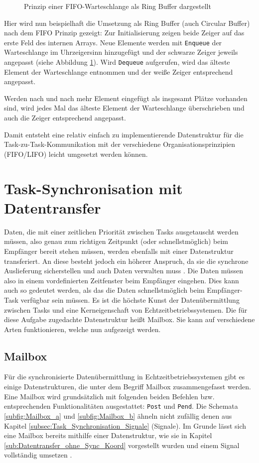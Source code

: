\documentclass{llncs}
\begin{document}
\begin{figure}
	\centering
	\def\svgwidth{0.30\columnwidth}
	
	\caption{\label{fig:RingBuffer}Prinzip einer FIFO-Warteschlange als Ring Buffer dargestellt \autocite[vgl.][97]{Cooling2017}}
\end{figure}

Hier wird nun beispielhaft die Umsetzung als Ring Buffer (auch Circular Buffer) nach dem FIFO Prinzip gezeigt: Zur Initialisierung zeigen beide Zeiger auf das erste Feld des internen Arrays. Neue Elemente werden mit \texttt{Enqueue} der Warteschlange im Uhrzeigersinn hinzugefügt und der schwarze Zeiger jeweils angepasst (siehe Abbildung \ref{fig:RingBuffer}). Wird \texttt{Dequeue} aufgerufen, wird das älteste Element der Warteschlange entnommen und der weiße Zeiger entsprechend angepasst.

Werden nach und nach mehr Element eingefügt als insgesamt Plätze vorhanden sind, wird jedes Mal das älteste Element der Warteschlange überschrieben und auch die Zeiger entsprechend angepasst.

Damit entsteht eine relativ einfach zu implementierende Datenstruktur für die Task-zu-Task-Kommunikation mit der verschiedene Organisationsprinzipien (FIFO/LIFO) leicht umgesetzt werden können.

\section{Task-Synchronisation mit Datentransfer}
\label{sub:Task_Synchronisation_Datentransfer}
Daten, die mit einer zeitlichen Priorität zwischen Tasks ausgetauscht werden müssen, also genau zum richtigen Zeitpunkt (oder schnellstmöglich) beim Empfänger bereit stehen müssen, werden ebenfalls mit einer Datenstruktur transferiert. An diese besteht jedoch ein höherer Anspruch, da sie die synchrone Auslieferung sicherstellen und auch Daten verwalten muss \autocite[vgl.][99]{Cooling2017}. Die Daten müssen also in einem vordefinierten Zeitfenster beim Empfänger eingehen. Dies kann auch so gedeutet werden, als das die Daten schnellstmöglich beim Empfänger-Task verfügbar sein müssen. Es ist die höchste Kunst der Datenübermittlung zwischen Tasks und eine Kerneigenschaft von Echtzeitbetriebssystemen. Die für diese Aufgabe zugedachte Datenstruktur heißt Mailbox. Sie kann auf verschiedene Arten funktionieren, welche nun aufgezeigt werden.

\subsection{Mailbox}
Für die synchronisierte Datenübermittlung in Echtzeitbetriebssystemen gibt es einige Datenstrukturen, die unter dem Begriff Mailbox zusammengefasst werden. Eine Mailbox wird grundsätzlich mit folgenden beiden Befehlen bzw. entsprechenden Funktionalitäten ausgestattet:
\texttt{Post} und \texttt{Pend}. Die Schemata \ref{subfig:Mailbox_a} und \ref{subfig:Mailbox_b} ähneln nicht zufällig denen aus Kapitel \ref{subsec:Task_Synchronisation_Signale} (Signale). Im Grunde lässt sich eine Mailbox bereits mithilfe einer Datenstruktur, wie sie in Kapitel \ref{sub:Datentransfer_ohne_Sync_Koord} vorgestellt wurden und einem Signal vollständig umsetzen \autocite[vgl.][99]{Cooling2017}.
\end{document}

